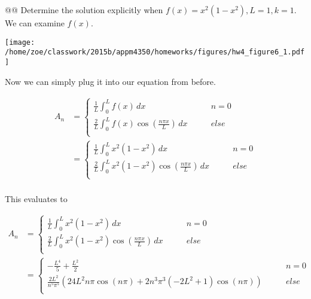 \documentclass[10pt]{article}
\begin{document}
\begin{easylist}[enumerate]
    @@ Determine the solution explicitly when $f(x) = x^2 (1 - x^2), L = 1, k = 1$.\\



    We can examine $f(x)$.

\simpleweave

\texttt{[image: /home/zoe/classwork/2015b/appm4350/homeworks/figures/hw4\_figure6\_1.pdf]}

\nosimpleweave

    Now we can simply plug it into our equation from before.

    \begin{align*}
        A_n &= \begin{cases}
            \frac{1}{L} \int_0^L f(x) \, dx \qquad &n = 0\\
            \frac{2}{L} \int_0^L f(x) \cos\left(\frac{n\pi x}{L} \right) \, dx \qquad &else\\
        \end{cases}\\
        &= \begin{cases}
            \frac{1}{L} \int_0^L x^2 (1 - x^2) \, dx \qquad &n = 0\\
            \frac{2}{L} \int_0^L x^2 (1 - x^2) \cos\left(\frac{n\pi x}{L} \right) \, dx \qquad &else\\
        \end{cases}\\
    \end{align*}

    This evaluates to 

    \begin{align*}
        A_n &= \begin{cases}
            \frac{1}{L} \int_0^L x^2 (1 - x^2) \, dx \qquad &n = 0\\
            \frac{2}{L} \int_0^L x^2 (1 - x^2) \cos\left(\frac{n\pi x}{L} \right) \, dx \qquad &else\\
        \end{cases}\\
            &= \begin{cases}
            -\frac{L^4}{5} + \frac{L^2}{2} \qquad &n = 0\\
            \frac{2L^2}{n^5\pi^5}\left(24L^2n\pi \cos(n\pi)+2n^3\pi^3(-2L^2+1)\cos(n\pi)\right) \qquad &else\\
        \end{cases}\\
    \end{align*}


\end{easylist}
\end{document}
